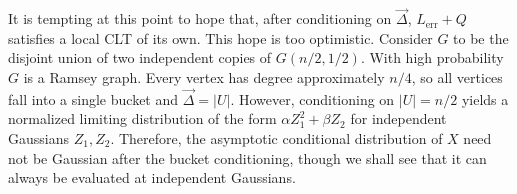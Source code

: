 
It is tempting at this point to hope that, after conditioning on $\vec\Delta$, $L_{\text{err}} + Q$ satisfies a local CLT of its own. This hope is too optimistic. Consider $G$ to be the disjoint union of two independent copies of $G(n/2, 1/2)$. With high probability $G$ is a Ramsey graph. Every vertex has degree approximately $n/4$, so all vertices fall into a single bucket and $\vec\Delta = |U|$. However, conditioning on $|U| = n/2$ yields a normalized limiting distribution of the form $\alpha Z_1^2 + \beta Z_2$ for independent Gaussians $Z_1, Z_2$. Therefore, the asymptotic conditional distribution of $X$ need not be Gaussian after the bucket conditioning, though we shall see that it can always be evaluated at independent Gaussians.


